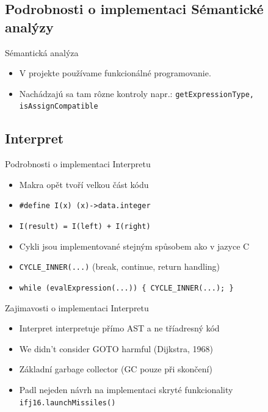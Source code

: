 \documentclass[13pt]{beamer}
\begin{document}
\subsection{Podrobnosti o implementaci Sémantické analýzy}

\begin{frame}{Sémantická analýza}
  \begin{itemize}
    \item V projekte používame funkcionálné programovanie.
    \item Nachádzajú sa tam rôzne kontroly napr.: \texttt{getExpressionType, isAssignCompatible}
  \end{itemize}
\end{frame}

\subsection{Interpret}

\begin{frame}{Podrobnosti o implementaci Interpretu}


  \begin{itemize}
    \item Makra opět tvoří velkou část kódu
    \item \texttt{\#define I(x) (x)->data.integer}
    \item \texttt{I(result) = I(left) + I(right)}
    \item Cykli jsou implementované stejným spůsobem ako v jazyce C
    \item \texttt{CYCLE\_INNER(...)} (break, continue, return handling)
    \item \texttt{while (evalExpression(...)) \{ CYCLE\_INNER(...); \}}
  \end{itemize}
\end{frame}

\begin{frame}{Zajimavosti o implementaci Interpretu}
  \begin{itemize}
    \item Interpret interpretuje přímo AST a ne tříadresný kód
    \item We didn't consider GOTO harmful (Dijkstra, 1968)
    \item Základní garbage collector (GC pouze při skončení)
    \item Padl nejeden návrh na implementaci skryté funkcionality \texttt{ifj16.launchMissiles()}
  \end{itemize}
\end{frame}
\end{document}
